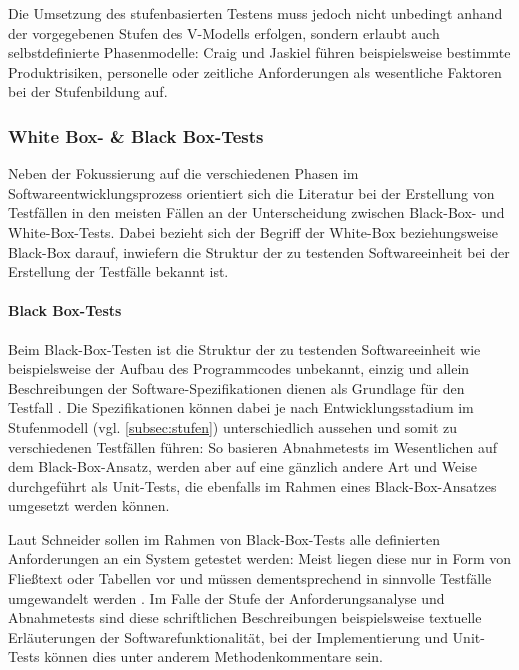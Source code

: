 Die Umsetzung des stufenbasierten Testens muss jedoch nicht unbedingt anhand der vorgegebenen Stufen des V-Modells erfolgen, sondern erlaubt auch selbstdefinierte Phasenmodelle: Craig und Jaskiel \cite[S. 98 f.]{craig2002systematic} führen beispielsweise bestimmte Produktrisiken, personelle oder zeitliche Anforderungen als wesentliche Faktoren bei der Stufenbildung auf.


\subsubsection{White Box- \& Black Box-Tests}\label{subsec:blackboxWhitebox}

Neben der Fokussierung auf die verschiedenen Phasen im Softwareentwicklungsprozess orientiert sich die Literatur bei der Erstellung von Testfällen in den meisten Fällen an der Unterscheidung zwischen Black-Box- und White-Box-Tests. Dabei bezieht sich der Begriff der White-Box beziehungsweise Black-Box darauf, inwiefern die Struktur der zu testenden Softwareeinheit bei der Erstellung der Testfälle bekannt ist.

\paragraph{Black Box-Tests}

Beim Black-Box-Testen ist die Struktur der zu testenden Softwareeinheit wie beispielsweise der Aufbau des Programmcodes unbekannt, einzig und allein Beschreibungen der Software-Spezifikationen dienen als Grundlage für den Testfall \cite[S. 91]{schneider2012abenteuer}. Die Spezifikationen können dabei je nach Entwicklungsstadium im Stufenmodell (vgl. \autoref{subsec:stufen}) unterschiedlich aussehen und somit zu verschiedenen Testfällen führen: So basieren Abnahmetests im Wesentlichen auf dem Black-Box-Ansatz, werden aber auf eine gänzlich andere Art und Weise durchgeführt als Unit-Tests, die ebenfalls im Rahmen eines Black-Box-Ansatzes umgesetzt werden können.

Laut Schneider \cite[S. 91]{schneider2012abenteuer} sollen im Rahmen von Black-Box-Tests alle definierten Anforderungen an ein System getestet werden: Meist liegen diese nur in Form von Fließtext oder Tabellen vor und müssen dementsprechend in sinnvolle Testfälle umgewandelt werden \cite[S. 92]{schneider2012abenteuer}. Im Falle der Stufe der Anforderungsanalyse und Abnahmetests sind diese schriftlichen Beschreibungen beispielsweise textuelle Erläuterungen der Softwarefunktionalität, bei der Implementierung und Unit-Tests können dies unter anderem Methodenkommentare sein.

